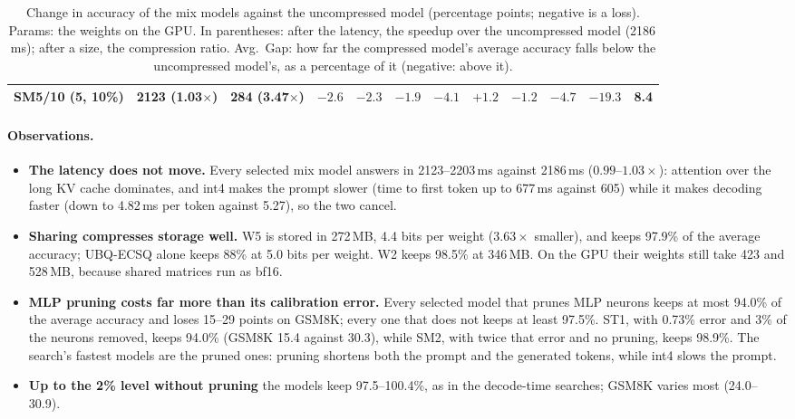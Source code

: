 \documentclass[11pt]{article}
\begin{document}
\begin{table}[!ht]
\begin{tabular}{lccccccccccc}
SM5/10 (5, 10\%) & 2123 (1.03$\times$) & 284 (3.47$\times$) & $-2.6$ & $-2.3$ & $-1.9$ & $-4.1$ & $+1.2$ & $-1.2$ & $-4.7$ & $-19.3$ & 8.4 \\
\bottomrule
\end{tabular}
\caption{Change in accuracy of the mix models against the uncompressed model (percentage points; negative is a loss). Params: the weights on the GPU. In parentheses: after the latency, the speedup over the uncompressed model (2186\,ms); after a size, the compression ratio. Avg.\ Gap: how far the compressed model's average accuracy falls below the uncompressed model's, as a percentage of it (negative: above it).}
\label{tab:turndelta}
\end{table}

\FloatBarrier
\paragraph{Observations.}
\begin{itemize}
  \item \textbf{The latency does not move.} Every selected mix model answers in 2123--2203\,ms against
        2186\,ms ($0.99$--$1.03\times$): attention over the long KV cache dominates, and int4 makes the prompt
        slower (time to first token up to 677\,ms against 605) while it makes decoding faster (down to
        4.82\,ms per token against 5.27), so the two cancel.
  \item \textbf{Sharing compresses storage well.} W5 is stored in 272\,MB, 4.4 bits per weight
        ($3.63\times$ smaller), and keeps 97.9\% of the average accuracy; UBQ-ECSQ alone keeps 88\% at 5.0
        bits per weight. W2 keeps 98.5\% at 346\,MB. On the GPU their weights still take 423 and 528\,MB,
        because shared matrices run as bf16.
  \item \textbf{MLP pruning costs far more than its calibration error.} Every selected model that prunes
        MLP neurons keeps at most 94.0\% of the average accuracy and loses 15--29 points on GSM8K; every
        one that does not keeps at least 97.5\%. ST1, with 0.73\% error and 3\% of the neurons removed,
        keeps 94.0\% (GSM8K 15.4 against 30.3), while SM2, with twice that error and no pruning, keeps
        98.9\%. The search's fastest models are the pruned ones: pruning shortens both the prompt and the
        generated tokens, while int4 slows the prompt.
  \item \textbf{Up to the 2\% level without pruning} the models keep 97.5--100.4\%, as in the decode-time
        searches; GSM8K varies most (24.0--30.9).
\end{itemize}
\end{document}
